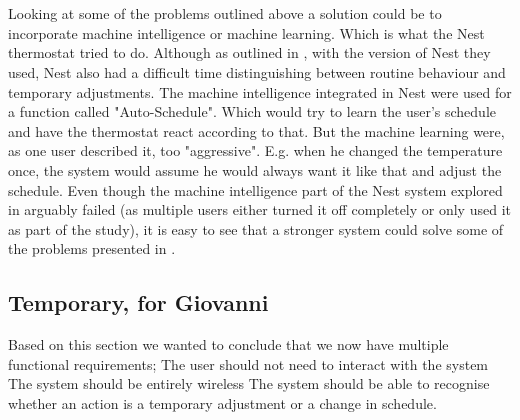 \\\\
Looking at some of the problems outlined above a solution could be to incorporate machine intelligence or machine learning. Which is what the Nest thermostat\cite{AdaptiveInterviews} tried to do. Although as outlined in \cite{AdaptiveInterviews}, with the version of Nest they used, Nest also had a difficult time distinguishing between routine behaviour and temporary adjustments. The machine intelligence integrated in Nest were used for a function called "Auto-Schedule". Which would try to learn the user's schedule and have the thermostat react according to that. But the machine learning were, as one user described it\cite{AdaptiveInterviews}, too "aggressive". E.g. when he changed the temperature once, the system would assume he would always want it like that and adjust the schedule.
Even though the machine intelligence part of the Nest system explored in \cite{AdaptiveInterviews} arguably failed (as multiple users either turned it off completely or only used it as part of the study), it is easy to see that a stronger system could solve some of the problems presented in \cite{HAInterviews}. 
\subsection{Temporary, for Giovanni}
Based on this section we wanted to conclude that we now have multiple functional requirements;
The user should not need to interact with the system
The system should be entirely wireless
The system should be able to recognise whether an action is a temporary adjustment or a change in schedule.
